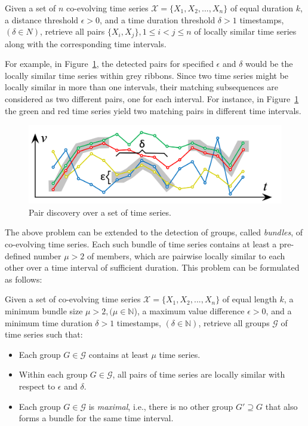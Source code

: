 \begin{problem}
Given a set of $n$ co-evolving time series $\mathcal{X}=\{X_1,X_2,...,X_n\}$ of equal duration $k$, a distance threshold $\epsilon>0$, and a time duration threshold $\delta>1$ timestamps, $(\delta \in N)$, retrieve all pairs $\{X_i, X_j\}, 1 \leq i < j \leq n$ of locally similar time series along with the corresponding time intervals.
\end{problem}

For example, in Figure~\ref{fig:sim_join}, the detected pairs for specified $\epsilon$ and $\delta$ would be the locally similar time series within grey ribbons. Since two time series might be locally similar in more than one intervals, their matching subsequences are considered as two different pairs, one for each interval. For instance, in Figure~\ref{fig:sim_join} the green and red time series yield two matching pairs in different time intervals.

\begin{figure}[tb]
    \centering
    \includegraphics[width=\columnwidth]{figures/sim_join.png}
    \caption{Pair discovery over a set of time series.}
    \label{fig:sim_join}
\end{figure}

The above problem can be extended to the detection of groups, called \textit{bundles}, of co-evolving time series. Each such bundle of time series contains at least a pre-defined number $\mu > 2$ of members, which are pairwise locally similar to each other over a time interval of sufficient duration. This problem can be formulated as follows:

\begin{problem}
Given a set of co-evolving time series $\mathcal{X}=\{X_1,X_2,...,X_n\}$ of equal length $k$, a minimum bundle size $\mu > 2, (\mu \in \mathbb{N}$), a maximum value difference $\epsilon>0$, and a minimum time duration $\delta>1$ timestamps, $(\delta \in \mathbb{N})$, retrieve all groups $\mathcal{G}$ of time series such that:

\begin{itemize}
    \item Each group $G \in \mathcal{G}$ contains at least $\mu$ time series.
    \item Within each group $G \in \mathcal{G}$, all pairs of time series are locally similar with respect to $\epsilon$ and $\delta$.
    \item Each group $G \in \mathcal{G}$ is \textit{maximal}, i.e., there is no other group $G' \supseteq G$ that also forms a bundle for the same time interval. 
\end{itemize}
\end{problem}

